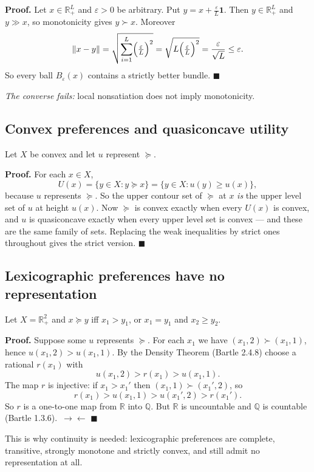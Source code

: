 \documentclass[11pt,a4paper]{article}
\newcommand{\slideref}[1]{\par\vspace{-.3em}{\small\itshape Supports: #1.}\par\vspace{.55em}}
\newcommand{\done}{\hfill$\blacksquare$}
\newcommand{\contra}{\ensuremath{\rightarrow\leftarrow}}
\begin{document}
\noindent\textbf{Proof.}
Let $x\in\mathbb{R}_+^L$ and $\varepsilon>0$ be arbitrary. Put
$y=x+\frac{\varepsilon}{L}\mathbf 1$. Then $y\in\mathbb{R}_+^L$ and $y\gg x$,
so monotonicity gives $y\succ x$. Moreover
\[
\lVert x-y\rVert
=\sqrt{\sum_{i=1}^{L}\Bigl(\tfrac{\varepsilon}{L}\Bigr)^{2}}
=\sqrt{L\Bigl(\tfrac{\varepsilon}{L}\Bigr)^{2}}
=\frac{\varepsilon}{\sqrt L}\leq\varepsilon .
\]
So every ball $B_\varepsilon(x)$ contains a strictly better bundle.
\done

\noindent
\emph{The converse fails:} local nonsatiation does not imply monotonicity.

\subsection{Convex preferences and quasiconcave utility}
\slideref{``Convex Preferences and Quasiconcave Utility'' (Kreps 2.8b)}
Let $X$ be convex and let $u$ represent $\succeq$.

\noindent\textbf{Proof.}
For each $x\in X$,
\[
U(x)=\{y\in X:y\succeq x\}=\{y\in X:u(y)\geq u(x)\},
\]
because $u$ represents $\succeq$. So the upper contour set of $\succeq$ at $x$
\emph{is} the upper level set of $u$ at height $u(x)$. Now $\succeq$ is convex
exactly when every $U(x)$ is convex, and $u$ is quasiconcave exactly when every
upper level set is convex --- and these are the same family of sets. Replacing
the weak inequalities by strict ones throughout gives the strict version.
\done

\subsection{Lexicographic preferences have no representation}
\slideref{``Lexicographic Preferences'' (MWG Example 3.C.1)}
Let $X=\mathbb{R}_+^2$ and $x\succeq y$ iff $x_1>y_1$, or $x_1=y_1$ and
$x_2\geq y_2$.

\noindent\textbf{Proof.}
Suppose some $u$ represents $\succeq$. For each $x_1$ we have
$(x_1,2)\succ(x_1,1)$, hence $u(x_1,2)>u(x_1,1)$. By the Density Theorem
(Bartle 2.4.8) choose a rational $r(x_1)$ with
\[
u(x_1,2)>r(x_1)>u(x_1,1).
\]
The map $r$ is injective: if $x_1>x_1'$ then $(x_1,1)\succ(x_1',2)$, so
\[
r(x_1)>u(x_1,1)>u(x_1',2)>r(x_1').
\]
So $r$ is a one-to-one map from $\mathbb{R}$ into $\mathbb{Q}$. But $\mathbb{R}$
is uncountable and $\mathbb{Q}$ is countable (Bartle 1.3.6).~\contra
\done

\noindent
This is why continuity is needed: lexicographic preferences are complete,
transitive, strongly monotone and strictly convex, and still admit no
representation at all.
\end{document}
